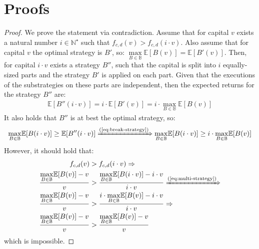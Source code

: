 \appendix

\section{Proofs}\label{sec:proofs}

\restateLemSybilStrategies*
\begin{proof}
    We prove the statement via contradiction. Assume that for capital $v$
    exists a natural number $i \in \mathbb{N}^\star$ such that
    $f_{c,d}(v) > f_{c,d}(i \cdot v)$. Also assume that for
    capital $v$ the optimal strategy is $B'$, so: $\underset{B \in
    \mathbb{B}}{\max}{\mathbb{E}[B(v)]} = \mathbb{E}[B'(v)]$. Then, for capital
    $i \cdot v$ exists a strategy $B''$, such that the capital is split into $i$
    equally-sized parts and the strategy $B'$ is applied on each part. Given
    that the executions of the substrategies on these parts are independent,
    then the expected returns for the strategy $B''$ are:
    \begin{align}\label{eq:break-strategy}
        \mathbb{E}[B''(i \cdot v)] = i \cdot \mathbb{E}[B'(v)]  = i \cdot \underset{B \in \mathbb{B}}{\max}{\mathbb{E}[B(v)]}
    \end{align}
    It also holds that $B''$ is at best the optimal strategy, so:
    \begin{align}\label{eq:multi-strategy}
        \underset{B \in \mathbb{B}}{\max}{\mathbb{E}[B(i \cdot v)]} \geq \mathbb{E}[B''(i \cdot v)] \xRightarrow{\text{(\ref{eq:break-strategy})}}
        \underset{B \in \mathbb{B}}{\max}{\mathbb{E}[B(i \cdot v)]} \geq i \cdot \underset{B \in \mathbb{B}}{\max}{\mathbb{E}[B(v)]}
    \end{align}
    However, it should hold that:
    \begin{alignat}{2}
        f_{c,d}(v) &> f_{c,d}(i \cdot v) \Rightarrow \notag\\
        \frac{\underset{B \in \mathbb{B}}{\max}{\mathbb{E}[B(v)]} - v}{v} &> \frac{\underset{B \in \mathbb{B}}{\max}{\mathbb{E}[B(i \cdot v)]} - i \cdot v}{i \cdot v} \xRightarrow{\text{(\ref{eq:multi-strategy})}} \notag\\
        \frac{\underset{B \in \mathbb{B}}{\max}{\mathbb{E}[B(v)]} - v}{v} &> \frac{i \cdot \underset{B \in \mathbb{B}}{\max}{\mathbb{E}[B(v)]} - i \cdot v}{i \cdot v} \Rightarrow \notag\\
        \frac{\underset{B \in \mathbb{B}}{\max}{\mathbb{E}[B(v)]} - v}{v} &> \frac{\underset{B \in \mathbb{B}}{\max}{\mathbb{E}[B(v)]} - v}{v}
    \end{alignat}
    which is impossible.
\end{proof}

